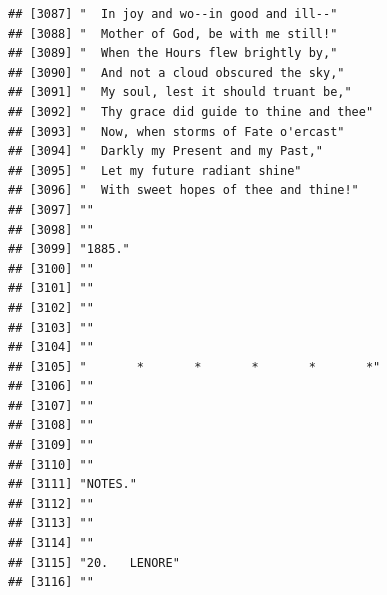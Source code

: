 \documentclass{article}\usepackage[]{graphicx}\usepackage[]{color}
\makeatletter
\newenvironment{kframe}{%
 \def\at@end@of@kframe{}%
 \ifinner\ifhmode%
  \def\at@end@of@kframe{\end{minipage}}%
  \begin{minipage}{\columnwidth}%
 \fi\fi%
 \def\FrameCommand##1{\hskip\@totalleftmargin \hskip-\fboxsep
 \colorbox{shadecolor}{##1}\hskip-\fboxsep
     \hskip-\linewidth \hskip-\@totalleftmargin \hskip\columnwidth}%
 \MakeFramed {\advance\hsize-\width
   \@totalleftmargin\z@ \linewidth\hsize
   \@setminipage}}%
 {\par\unskip\endMakeFramed%
 \at@end@of@kframe}
\newenvironment{knitrout}{}{} %
\makeatother
\begin{document}
\begin{knitrout}
\begin{kframe}
\begin{verbatim}
## [3087] "  In joy and wo--in good and ill--"                                          
## [3088] "  Mother of God, be with me still!"                                          
## [3089] "  When the Hours flew brightly by,"                                          
## [3090] "  And not a cloud obscured the sky,"                                         
## [3091] "  My soul, lest it should truant be,"                                        
## [3092] "  Thy grace did guide to thine and thee"                                     
## [3093] "  Now, when storms of Fate o'ercast"                                         
## [3094] "  Darkly my Present and my Past,"                                            
## [3095] "  Let my future radiant shine"                                               
## [3096] "  With sweet hopes of thee and thine!"                                       
## [3097] ""                                                                            
## [3098] ""                                                                            
## [3099] "1885."                                                                       
## [3100] ""                                                                            
## [3101] ""                                                                            
## [3102] ""                                                                            
## [3103] ""                                                                            
## [3104] ""                                                                            
## [3105] "       *       *       *       *       *"                                    
## [3106] ""                                                                            
## [3107] ""                                                                            
## [3108] ""                                                                            
## [3109] ""                                                                            
## [3110] ""                                                                            
## [3111] "NOTES."                                                                      
## [3112] ""                                                                            
## [3113] ""                                                                            
## [3114] ""                                                                            
## [3115] "20.   LENORE"                                                                
## [3116] ""                                                                            

\end{verbatim}
\end{kframe}
\end{knitrout}
\end{document}
